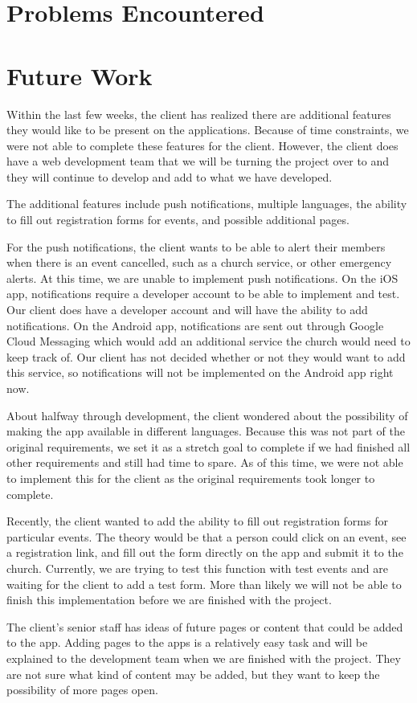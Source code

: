 \documentclass[letterpaper,10pt,draftclsnofoot,onecolumn,titlepage]{IEEEtran}
\begin{document}
\section{Problems Encountered}

\section{Future Work}
		Within the last few weeks, the client has realized there are additional features they would like to be present on the applications.
		Because of time constraints, we were not able to complete these features for the client.
		However, the client does have a web development team that we will be turning the project over to and they will continue to develop and add to what we have developed.

		The additional features include push notifications, multiple languages, the ability to fill out registration forms for events, and possible additional pages.

		For the push notifications, the client wants to be able to alert their members when there is an event cancelled, such as a church service, or other emergency alerts.
		At this time, we are unable to implement push notifications.
		On the iOS app, notifications require a developer account to be able to implement and test.
		Our client does have a developer account and will have the ability to add notifications.
		On the Android app, notifications are sent out through Google Cloud Messaging which would add an additional service the church would need to keep track of.
		Our client has not decided whether or not they would want to add this service, so notifications will not be implemented on the Android app right now.

		About halfway through development, the client wondered about the possibility of making the app available in different languages.
		Because this was not part of the original requirements, we set it as a stretch goal to complete if we had finished all other requirements and still had time to spare.
		As of this time, we were not able to implement this for the client as the original requirements took longer to complete.

		Recently, the client wanted to add the ability to fill out registration forms for particular events.
		The theory would be that a person could click on an event, see a registration link, and fill out the form directly on the app and submit it to the church.
		Currently, we are trying to test this function with test events and are waiting for the client to add a test form.
		More than likely we will not be able to finish this implementation before we are finished with the project.

		The client's senior staff has ideas of future pages or content that could be added to the app.
		Adding pages to the apps is a relatively easy task and will be explained to the development team when we are finished with the project.
		They are not sure what kind of content may be added, but they want to keep the possibility of more pages open.
\end{document}
